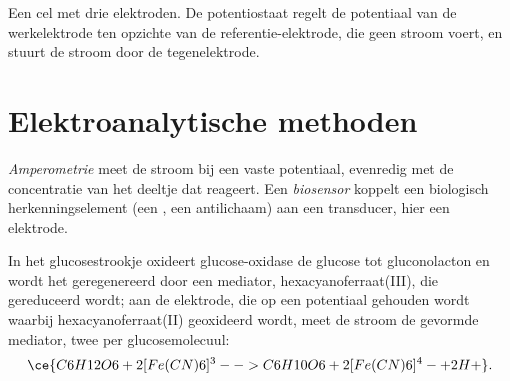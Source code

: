 \begin{omfigure}

{\small Een cel met drie elektroden. De potentiostaat regelt de
potentiaal van de werkelektrode ten opzichte van de referentie-elektrode,
die geen stroom voert, en stuurt de stroom door de tegenelektrode.}
\end{omfigure}

\section{Elektroanalytische methoden}

\begin{definition}\label{def:b3:electrode-kinetics:amperometry}
\emph{Amperometrie} meet de stroom bij een vaste
potentiaal, evenredig met de concentratie van het deeltje dat reageert.
Een
\emph{biosensor} koppelt een biologisch herkenningselement
(een , een antilichaam) aan een transducer, hier een elektrode.
\end{definition}

In het glucosestrookje oxideert glucose-oxidase de glucose tot
gluconolacton en wordt het geregenereerd door een mediator,
hexacyanoferraat(III), die gereduceerd wordt; aan de elektrode, die op een
potentiaal gehouden wordt waarbij hexacyanoferraat(II) geoxideerd wordt,
meet de stroom de gevormde mediator, twee per glucosemolecuul:
\[
  \ce{C6H12O6 + 2 [Fe(CN)6]^3- -> C6H10O6 + 2 [Fe(CN)6]^4- + 2 H+} .
\]

